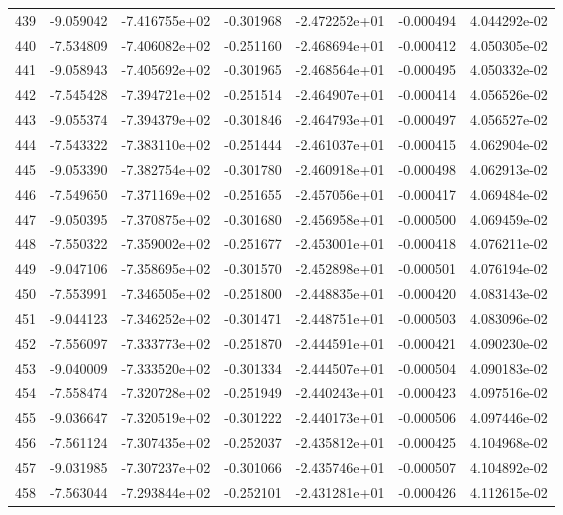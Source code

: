 \begin{tabular}{rrrrrrr}
 439 &  -9.059042 & -7.416755e+02 & -0.301968 & -2.472252e+01 &   -0.000494 &  4.044292e-02 \\
 440 &  -7.534809 & -7.406082e+02 & -0.251160 & -2.468694e+01 &   -0.000412 &  4.050305e-02 \\
 441 &  -9.058943 & -7.405692e+02 & -0.301965 & -2.468564e+01 &   -0.000495 &  4.050332e-02 \\
 442 &  -7.545428 & -7.394721e+02 & -0.251514 & -2.464907e+01 &   -0.000414 &  4.056526e-02 \\
 443 &  -9.055374 & -7.394379e+02 & -0.301846 & -2.464793e+01 &   -0.000497 &  4.056527e-02 \\
 444 &  -7.543322 & -7.383110e+02 & -0.251444 & -2.461037e+01 &   -0.000415 &  4.062904e-02 \\
 445 &  -9.053390 & -7.382754e+02 & -0.301780 & -2.460918e+01 &   -0.000498 &  4.062913e-02 \\
 446 &  -7.549650 & -7.371169e+02 & -0.251655 & -2.457056e+01 &   -0.000417 &  4.069484e-02 \\
 447 &  -9.050395 & -7.370875e+02 & -0.301680 & -2.456958e+01 &   -0.000500 &  4.069459e-02 \\
 448 &  -7.550322 & -7.359002e+02 & -0.251677 & -2.453001e+01 &   -0.000418 &  4.076211e-02 \\
 449 &  -9.047106 & -7.358695e+02 & -0.301570 & -2.452898e+01 &   -0.000501 &  4.076194e-02 \\
 450 &  -7.553991 & -7.346505e+02 & -0.251800 & -2.448835e+01 &   -0.000420 &  4.083143e-02 \\
 451 &  -9.044123 & -7.346252e+02 & -0.301471 & -2.448751e+01 &   -0.000503 &  4.083096e-02 \\
 452 &  -7.556097 & -7.333773e+02 & -0.251870 & -2.444591e+01 &   -0.000421 &  4.090230e-02 \\
 453 &  -9.040009 & -7.333520e+02 & -0.301334 & -2.444507e+01 &   -0.000504 &  4.090183e-02 \\
 454 &  -7.558474 & -7.320728e+02 & -0.251949 & -2.440243e+01 &   -0.000423 &  4.097516e-02 \\
 455 &  -9.036647 & -7.320519e+02 & -0.301222 & -2.440173e+01 &   -0.000506 &  4.097446e-02 \\
 456 &  -7.561124 & -7.307435e+02 & -0.252037 & -2.435812e+01 &   -0.000425 &  4.104968e-02 \\
 457 &  -9.031985 & -7.307237e+02 & -0.301066 & -2.435746e+01 &   -0.000507 &  4.104892e-02 \\
 458 &  -7.563044 & -7.293844e+02 & -0.252101 & -2.431281e+01 &   -0.000426 &  4.112615e-02 \\

\end{tabular}
